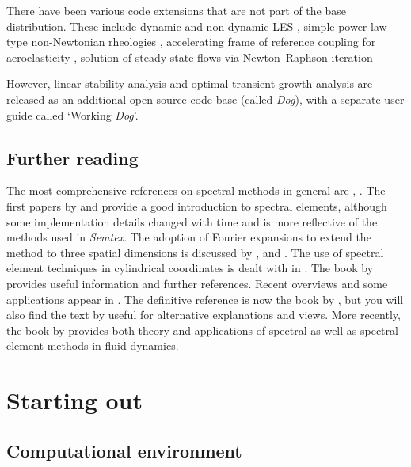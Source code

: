 \documentclass[11pt]{report}
\newcommand{\Semtex}{\emph{Semtex}} \newcommand{\Dog}{\emph{Dog}}
\begin{document}
There have been various code extensions that are not part of the base
distribution. These include dynamic and non-dynamic LES
\citep{blsc03}, simple power-law type non-Newtonian rheologies
\citep{rb06}, accelerating frame of reference coupling for
aeroelasticity \citep{bh96a,bh99,bgw01,hmb03}, solution of
steady-state flows via Newton--Raphson iteration \citep{hmb02a}

However, linear stability analysis
\citep{hmb02a,bllo03b,bllo03a,bml05,shbl05,ebs06,blsh07} and optimal
transient growth analysis \citep{bbs08a} are released as an additional
open-source code base (called \Dog), with a separate user guide
called `Working \Dog'.

\section{Further reading}

The most comprehensive references on spectral methods in general are
\citet{gs77}, \citet{chqz88,chqz06}.  The first papers by
\citet{pat84} and \citet{kp86} provide a good introduction to spectral
elements, although some implementation details changed with time and
\citet{mt89} is more reflective of the methods used in \Semtex.  The
adoption of Fourier expansions to extend the method to three spatial
dimensions is discussed by \citet{ap89}, \citet{kar89} and
\citet{kar90}.  The use of spectral element techniques in cylindrical
coordinates is dealt with in \citet{blsh04}.  The book by
\citet{fun97} provides useful information and further references.
Recent overviews and some applications appear in \citet{kh98,hen99b}.
The definitive reference is now the book by \citet{kars05}, but you
will also find the text by \citet*{dfm02} useful for alternative
explanations and views. More recently, the book by \citet{chqz07}
provides both theory and applications of spectral as well as spectral
element methods in fluid dynamics.

\chapter{Starting out}
\label{ch.start}

\section{Computational environment}
\end{document}
